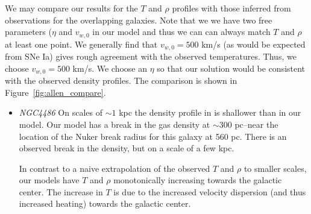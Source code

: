 \documentclass[usenatbib,fleqn]{mn2e}
\newcommand{\vwO}{v_{w,0}}
\begin{document}
We may compare our results for the $T$ and $\rho$ profiles with those inferred from observations for the overlapping galaxies.  Note that we we have two free parameters ($\eta$ and $\vwO$ in our model and thus we can can always match $T$ and $\rho$ at least one point.  We generally find that $\vwO=500$ km/s (as would be expected from SNe Ia) gives rough agreement with the observed temperatures.  Thus, we choose $\vwO=500$ km/s.  We choose an $\eta$ so that our solution would be consistent with the observed density profiles. The comparison is shown in Figure~\ref{fig:allen_compare}.


\begin{itemize}
\item \emph{NGC4486} %
On scales of $\sim1$ kpc the density profile in \citealt{AllenDunn+:2006a}  is shallower than in our model. Our model has a break in the gas density at $\sim 300$ pc--near the location of the Nuker break radius for this galaxy at 560 pc. There is an observed break in the density, but on a scale of a few kpc.

In contrast to a naive extrapolation of the observed $T$ and $\rho$ to smaller scales, our models have $T$ and $\rho$ monotonically increasing towards the galactic center. The increase in $T$ is due to the increased velocity dispersion (and thus increased heating) towards the galactic center.
\end{itemize}
\end{document}
